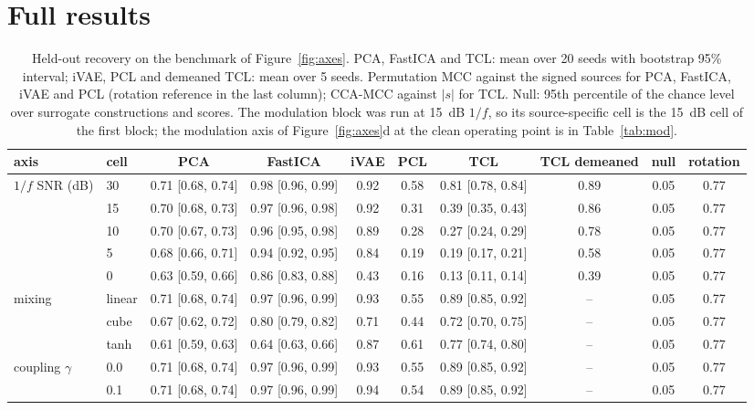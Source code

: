 \section{Full results}
\label{app:tables}

\begin{table}[h]\centering\small
\caption{Held-out recovery on the benchmark of Figure~\ref{fig:axes}. PCA, FastICA and TCL: mean over 20 seeds with bootstrap 95\% interval; iVAE, PCL and demeaned TCL: mean over 5 seeds. Permutation MCC against the signed sources for PCA, FastICA, iVAE and PCL (rotation reference in the last column); CCA-MCC against $|s|$ for TCL. Null: 95th percentile of the chance level over surrogate constructions and scores. The modulation block was run at 15~dB $1/f$, so its source-specific cell is the 15~dB cell of the first block; the modulation axis of Figure~\ref{fig:axes}d at the clean operating point is in Table~\ref{tab:mod}.}
\label{tab:full}
\begin{tabular}{llcccccccc}\toprule
axis & cell & PCA & FastICA & iVAE & PCL & TCL & TCL demeaned & null & rotation \\ \midrule
$1/f$ SNR (dB) & 30 & 0.71 [0.68, 0.74] & 0.98 [0.96, 0.99] & 0.92 & 0.58 & 0.81 [0.78, 0.84] & 0.89 & 0.05 & 0.77 \\
 & 15 & 0.70 [0.68, 0.73] & 0.97 [0.96, 0.98] & 0.92 & 0.31 & 0.39 [0.35, 0.43] & 0.86 & 0.05 & 0.77 \\
 & 10 & 0.70 [0.67, 0.73] & 0.96 [0.95, 0.98] & 0.89 & 0.28 & 0.27 [0.24, 0.29] & 0.78 & 0.05 & 0.77 \\
 & 5 & 0.68 [0.66, 0.71] & 0.94 [0.92, 0.95] & 0.84 & 0.19 & 0.19 [0.17, 0.21] & 0.58 & 0.05 & 0.77 \\
 & 0 & 0.63 [0.59, 0.66] & 0.86 [0.83, 0.88] & 0.43 & 0.16 & 0.13 [0.11, 0.14] & 0.39 & 0.05 & 0.77 \\
\midrule
mixing & linear & 0.71 [0.68, 0.74] & 0.97 [0.96, 0.99] & 0.93 & 0.55 & 0.89 [0.85, 0.92] & -- & 0.05 & 0.77 \\
 & cube & 0.67 [0.62, 0.72] & 0.80 [0.79, 0.82] & 0.71 & 0.44 & 0.72 [0.70, 0.75] & -- & 0.05 & 0.77 \\
 & tanh & 0.61 [0.59, 0.63] & 0.64 [0.63, 0.66] & 0.87 & 0.61 & 0.77 [0.74, 0.80] & -- & 0.05 & 0.77 \\
\midrule
coupling $\gamma$ & 0.0 & 0.71 [0.68, 0.74] & 0.97 [0.96, 0.99] & 0.93 & 0.55 & 0.89 [0.85, 0.92] & -- & 0.05 & 0.77 \\
 & 0.1 & 0.71 [0.68, 0.74] & 0.97 [0.96, 0.99] & 0.94 & 0.54 & 0.89 [0.85, 0.92] & -- & 0.05 & 0.77 \\

\end{tabular}
\end{table}
